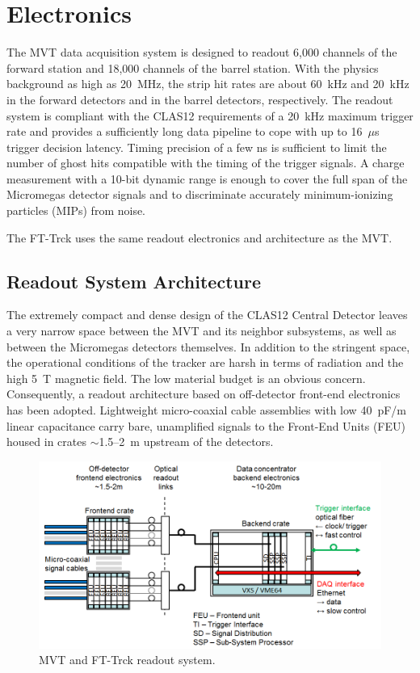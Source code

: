 \section{Electronics}

The MVT data acquisition system is designed to readout 6,000 channels of the forward station and 18,000 channels of the
barrel station. With the physics background as high as 20~MHz, the strip hit rates are about 60~kHz and 20~kHz in the
forward detectors and in the barrel detectors, respectively. The readout system is compliant with the CLAS12 requirements
of a 20~kHz maximum trigger rate and provides a sufficiently long data pipeline to cope with up to 16~$\mu$s trigger decision
latency. Timing precision of a few ns is sufficient to limit the number of ghost hits compatible with the timing of the trigger
signals. A charge measurement with a 10-bit dynamic range is enough to cover the full span of the Micromegas detector signals
and to discriminate accurately minimum-ionizing particles (MIPs) from noise.

The FT-Trck uses the same readout electronics and architecture as the MVT.

\subsection{Readout System Architecture}

The extremely compact and dense design of the CLAS12 Central Detector leaves a very narrow space between the MVT and
its neighbor subsystems, as well as between the Micromegas detectors themselves.  In addition to the stringent space, the
operational conditions of the tracker are harsh in terms of radiation and the high 5~T magnetic field. The low material budget
is an obvious concern. Consequently, a readout architecture based on off-detector front-end electronics has been adopted.
Lightweight micro-coaxial cable assemblies with low 40~pF/m linear capacitance carry bare, unamplified signals to the Front-End
Units (FEU) housed in crates $\sim$1.5--2~m upstream of the detectors. 

\begin{figure}[htb]
\begin{center}
 \includegraphics[width=1.6\columnwidth,keepaspectratio]{images/electronics_fig1.png}
\end{center}

 \caption{MVT and FT-Trck readout system.}
 \label{fig:mm-e_1}
\end{figure}

